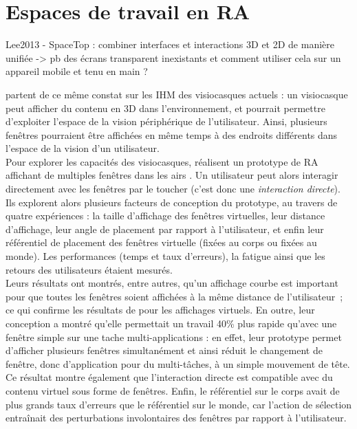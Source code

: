 \section{Espaces de travail en RA}
Lee2013 - SpaceTop : combiner interfaces et interactions 3D et 2D de manière unifiée -> pb des écrans transparent inexistants et comment utiliser cela sur un appareil mobile et tenu en main ?

\citet{Ens2014} partent de ce même constat sur les IHM des visiocasques actuels : un visiocasque peut afficher du contenu en 3D dans l'environnement, et pourrait permettre d'exploiter l'espace de la vision périphérique de l'utilisateur. Ainsi, plusieurs fenêtres pourraient être affichées en même temps à des endroits différents dans l'espace de la vision d'un utilisateur.\\
Pour explorer les capacités des visiocasques, \citeauthor{Ens2014} réalisent un prototype de RA affichant de multiples fenêtres dans les airs . Un utilisateur peut alors interagir directement avec les fenêtres par le toucher (c'est donc une \emph{interaction directe}). Ils explorent alors plusieurs facteurs de conception du prototype, au travers de quatre expériences : la taille d'affichage des fenêtres virtuelles, leur distance d'affichage, leur angle de placement par rapport à l'utilisateur, et enfin leur référentiel de placement des fenêtres virtuelle (fixées au corps ou fixées au monde). Les performances (temps et taux d'erreurs), la fatigue ainsi que les retours des utilisateurs étaient mesurés.\\ 
Leurs résultats ont montrés, entre autres, qu'un affichage courbe est important pour que toutes les fenêtres soient affichées à la même distance de l'utilisateur~; ce qui confirme les résultats de \citet{ShuppBallYostEtAl2006} pour les affichages virtuels. En outre, leur conception a montré qu'elle permettait un travail 40\% plus rapide qu'avec une fenêtre simple sur une tache multi-applications : en effet, leur prototype permet d'afficher plusieurs fenêtres simultanément et ainsi réduit le changement de fenêtre, donc d'application pour du multi-tâches, à un simple mouvement de tête. Ce résultat montre également que l'interaction directe est compatible avec du contenu virtuel sous forme de fenêtres. Enfin, le référentiel sur le corps avait de plus grands taux d'erreurs que le référentiel sur le monde, car l'action de sélection entraînait des perturbations involontaires des fenêtres par rapport à l'utilisateur.\\ 
